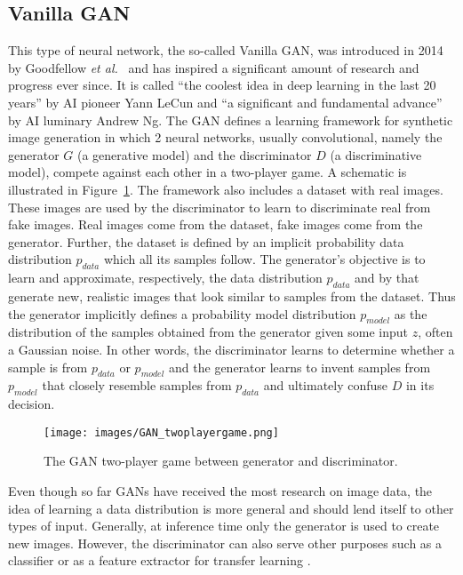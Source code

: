 \documentclass[a4paper,12pt]{report}
\begin{document}
\subsection{Vanilla GAN}\label{subsec:vanillaGan}
This type of neural network, the so-called Vanilla GAN, was introduced in 2014 by Goodfellow \textit{et al.}~\cite{1406.2661} and has inspired a significant amount of research and progress ever since. It is called ``the coolest idea in deep learning in the last 20 years'' by AI pioneer Yann LeCun and ``a significant and fundamental advance'' by AI luminary Andrew Ng. The GAN defines a learning framework for synthetic image generation in which 2 neural networks, usually convolutional, namely the generator $G$ (a generative model) and the discriminator $D$ (a discriminative model), compete against each other in a two-player game. A schematic is illustrated in Figure~\ref{fig:gan_learning}. The framework also includes a dataset with real images. These images are used by the discriminator to learn to discriminate real from fake images. Real images come from the dataset, fake images come from the generator. Further, the dataset is defined by an implicit probability data distribution $p_{data}$ which all its samples follow. The generator's objective is to learn and approximate, respectively, the data distribution $p_{data}$ and by that generate new, realistic images that look similar to samples from the dataset. Thus the generator implicitly defines a probability model distribution $p_{model}$ as the distribution of the samples obtained from the generator given some input $z$, often a Gaussian noise. In other words, the discriminator learns to determine whether a sample is from $p_{data}$ or $p_{model}$ and the generator learns to invent samples from $p_{model}$ that closely resemble samples from $p_{data}$ and ultimately confuse $D$ in its decision.  
\begin{figure}[ht]
\centering
\texttt{[image: images/GAN\_twoplayergame.png]}
\caption{The GAN two-player game between generator and discriminator.}
\label{fig:gan_learning}
\end{figure}

Even though so far GANs have received the most research on image data, the idea of learning a data distribution is more general and should lend itself to other types of input. Generally, at inference time only the generator is used to create new images. However, the discriminator can also serve other purposes such as a classifier \cite{ImprTechn4TrainGANs} or as a feature extractor for transfer learning \cite{SpotArtifacts}.
\end{document}
